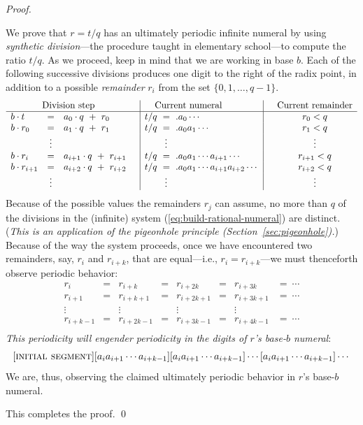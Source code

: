 \begin{proof}
\begin{enumerate}
We prove that $r = t/q$ has an ultimately periodic infinite numeral by using {\it synthetic division}---the procedure taught in elementary school---to compute the ratio $t/q$.  As we proceed, keep in mind that we are working in base $b$.  Each of the following successive divisions produces one digit to the right of the radix point, in addition to a possible {\it remainder} $r_i$ from the set $\{0, 1, \ldots, q-1\}$.
\begin{equation}
\label{eq:build-rational-numeral}
\begin{array}{lclc|l|cc}
\multicolumn{3}{c}{\mbox{Division step}} & &  \hspace*{.15in} \mbox{Current numeral} & &
\mbox{Current remainder} \\
\hline
b \cdot t   & = & a_0 \cdot q \ + \ r_0 &
      & t/q \ = \ .a_0 \cdots &
      & r_0 < q \\
b \cdot r_0 & = & a_1 \cdot q \ + \ r_1 &
      & t/q \ = \ .a_0 a_1 \cdots &
      & r_1 < q \\
            & \vdots &  & & \hspace*{.3in} \vdots &  & \vdots \\
b \cdot r_i & = & a_{i+1} \cdot q \ + \ r_{i+1} &
      & t/q \ = \ .a_0 a_1 \cdots a_{i+1} \cdots &
      & r_{i+1} < q \\
b \cdot r_{i+1} & = & a_{i+2} \cdot q \ + \ r_{i+2} &
      & t/q \ = \ .a_0 a_1 \cdots a_{i+1} a_{i+2} \cdots &
      & r_{i+2} < q \\
            & \vdots &  & &  \hspace*{.3in}\vdots & & \vdots   \\
\end{array}
\end{equation}
Because of the possible values the remainders $r_j$ can assume, no more than $q$ of the divisions in the (infinite) system (\ref{eq:build-rational-numeral}) are distinct.  ({\em This is an application of the pigeonhole principle (Section~\ref{sec:pigeonhole}).})  Because of the way the system proceeds, once we have encountered two remainders, say, $r_i$ and $r_{i+k}$, that are equal---i.e., $r_i = r_{i+k}$---we must thenceforth observe periodic behavior:
\[
\begin{array}{cccccccc}
r_i       & = & r_{i+k}    & = & r_{i+2k}   & = & r_{i+3k}   & = \ \cdots \\
r_{i+1}   & = & r_{i+k+1}  & = & r_{i+2k+1} & = & r_{i+3k+1} & = \ \cdots \\
\vdots    &   & \vdots     &   & \vdots     &   & \vdots     & \\
r_{i+k-1} & = & r_{i+2k-1} & = & r_{i+3k-1} & = & r_{i+4k-1} & = \ \cdots \\
\end{array}
\]
{\em This periodicity will engender periodicity in the digits of $r$'s base-$b$ numeral}:
\[ [\mbox{\sc initial segment}]
 [a_i a_{i+1} \cdots a_{i+k-1}]  [a_i a_{i+1} \cdots a_{i+k-1}]
    \cdots  [a_i a_{i+1} \cdots a_{i+k-1}] \cdots 
\]
We are, thus, observing the claimed ultimately periodic behavior in $r$'s base-$b$ numeral.
\end{enumerate}
\noindent This completes the proof. \qed
\end{proof}

